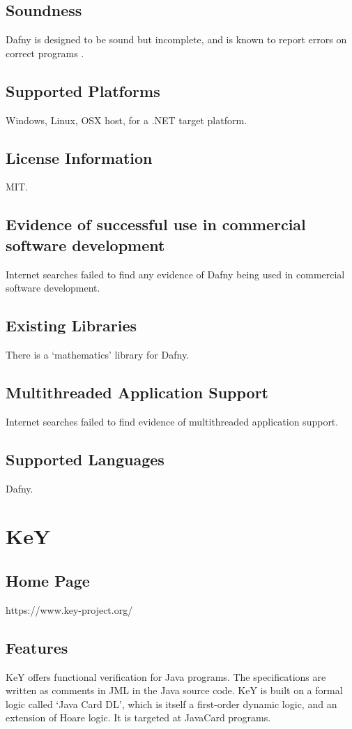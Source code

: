 \documentclass[12pt,openany,a4paper]{book}
\begin{document}
	\subsection{Soundness}
		Dafny is designed to be sound but incomplete, and is known to report errors on correct programs \cite{dafny01}.
	\subsection{Supported Platforms}
		Windows, Linux, OSX host, for a .NET target platform.
	\subsection{License Information}
		MIT.
	\subsection{Evidence of successful use in commercial software development}
		Internet searches failed to find any evidence of Dafny being used in commercial software development. 		
	\subsection{Existing Libraries}
		There is a `mathematics' library for Dafny.
		
	\subsection{Multithreaded Application Support}
		Internet searches failed to find evidence of multithreaded application support. 
		
	\subsection{Supported Languages}
		Dafny.

\section{KeY}
	\subsection{Home Page}%
	https://www.key-project.org/
	\subsection{Features} 
		KeY offers functional verification for Java programs. The specifications are written as comments in JML in the Java source code. KeY is built on a formal logic called `Java Card DL', which is itself a first-order dynamic logic, and an extension of Hoare logic. It is targeted at JavaCard programs. 
\end{document}
